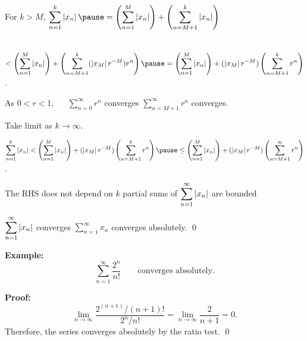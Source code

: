 \documentclass[10pt,aspectratio=169]{beamer}
\begin{document}
\begin{frame}
For $k > M$,
\quad
$\displaystyle
\sum_{n=1}^k \abs{x_n}
\pause
=
\left(\sum_{n=1}^{M} \abs{x_n} \right)
+
\left(\sum_{n=M+1}^{k} \abs{x_n} \right)
$

\pause
\medskip

\qquad\qquad\qquad\qquad\quad\,\!
$\displaystyle
<
\left(\sum_{n=1}^{M} \abs{x_n} \right)
+
\left(\sum_{n=M+1}^{k} 
(\abs{x_M} r^{-M}) r^n
\right)
%
\pause
%
=
\left(\sum_{n=1}^{M} \abs{x_n} \right)
+
(\abs{x_M} r^{-M})
\left( \sum_{n=M+1}^{k} r^n \right)$.

\pause
\medskip

As $0 < r < 1$, ~~
$\displaystyle\sum_{n=0}^{\infty} r^n$ converges
\pause
\wthus
$\displaystyle\sum_{n=M+1}^{\infty} r^n$ converges.

\pause
\medskip

Take limit as $k \to \infty$.

\pause
\medskip

$\displaystyle
\sum_{n=1}^k \abs{x_n}
<
\left(\sum_{n=1}^{M} \abs{x_n} \right)
+
(\abs{x_M} r^{-M})
\left( \sum_{n=M+1}^{k} r^n \right) 
\pause
\leq
\left(\sum_{n=1}^{M} \abs{x_n} \right)
+
(\abs{x_M} r^{-M})
\left( \sum_{n=M+1}^{\infty} r^n \right)$.


\pause
\medskip

The RHS does not depend on $k$
\pause
\wthus
partial sums of $\displaystyle\sum_{n=1}^\infty \left\lvert {x_n} \right\rvert$ are bounded

\pause
\thus \quad $\displaystyle\sum_{n=1}^\infty \left\lvert {x_n} \right\rvert$ converges
\pause
\wthus
$\displaystyle\sum_{n=1}^\infty x_n$ converges absolutely.
\qed

\end{frame}

\begin{frame}

\textbf{Example:}
\begin{equation*}
\sum_{n=1}^\infty \frac{2^n}{n!}
\qquad
\text{converges absolutely.}
\end{equation*}

\pause
\medskip

\textbf{Proof:}
\begin{equation*}
\lim_{n\to\infty} \frac{2^{(n+1)}/(n+1)!}{2^n / n!} =
\lim_{n\to\infty} \frac{2}{n+1} = 0 .
\end{equation*}
\pause
Therefore, the series converges absolutely by the ratio test.
\qed

\end{frame}
\end{document}
